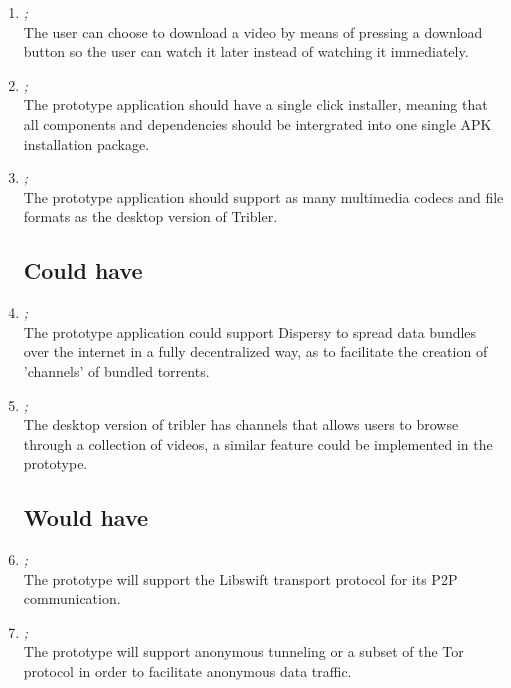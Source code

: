\begin{enumerate}
\item \emph{;}\\
The user can choose to download a video by means of pressing a download button so the user can watch it later instead of watching it immediately.

\item \emph{;}\\
The prototype application should have a single click installer, meaning that all components and dependencies should be intergrated into one single APK installation package.

\item \emph{;}\\
The prototype application should support as many multimedia codecs and file formats as the desktop version of Tribler.

\subsection{Could have}
\item \emph{;}\\
The prototype application could support Dispersy to spread data bundles over the internet in a fully decentralized way, as to facilitate the creation of 'channels' of bundled torrents.

\item \emph{;}\\
The desktop version of tribler has channels that allows users to browse through a collection of videos, a similar feature could be implemented in the prototype.

\subsection{Would have}
\item \emph{;}\\
The prototype will support the Libswift transport protocol for its P2P communication.

\item \emph{;}\\
The prototype will support anonymous tunneling or a subset of the Tor protocol in order to facilitate anonymous data traffic.


\end{enumerate}
